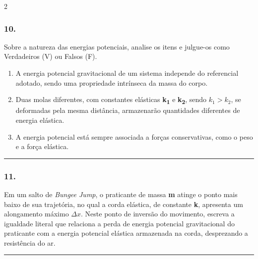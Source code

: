 \documentclass[twoside, 10pt, a4paper]{article}
\newlength{\espacoPreQuestao}\setlength{\espacoPreQuestao}{0.1cm}
\newlength{\espacoQuestao}\setlength{\espacoQuestao}{0.2cm}
\newlength{\espacoAlt}\setlength{\espacoAlt}{0.2cm}
\begin{document}
\begin{multicols*}{2}
\subsubsection*{10.} Sobre a natureza das energias potenciais, analise os itens e julgue-os como Verdadeiros (V) ou Falsos (F).
\begin{enumerate}[label=\Roman*., itemsep=\espacoAlt]
    \item A energia potencial gravitacional de um sistema independe do referencial adotado, sendo uma propriedade intrínseca da massa do corpo.
    \item Duas molas diferentes, com constantes elásticas \textbf{k\textsubscript{1}} e \textbf{k\textsubscript{2}}, sendo $k_1 > k_2$, se deformadas pela mesma distância, armazenarão quantidades diferentes de energia elástica.
    \item A energia potencial está sempre associada a forças conservativas, como o peso e a força elástica.
\end{enumerate}
\par\vspace{\espacoQuestao}
\noindent\textcolor{CorLinha}{\rule{\linewidth}{0.5pt}} 
\par\vspace{\espacoPreQuestao}
\subsubsection*{11.} Em um salto de \textit{Bungee Jump}, o praticante de massa \textbf{m} atinge o ponto mais baixo de sua trajetória, no qual a corda elástica, de constante \textbf{k}, apresenta um alongamento máximo \textbf{$\Delta x$}. Neste ponto de inversão do movimento, escreva a igualdade literal que relaciona a perda de energia potencial gravitacional do praticante com a energia potencial elástica armazenada na corda, desprezando a resistência do ar.
\par\vspace{\espacoQuestao}

\noindent\textcolor{CorLinha}{\rule{\linewidth}{0.5pt}} 
\par\vspace{\espacoPreQuestao}

\end{multicols*}
\end{document}

